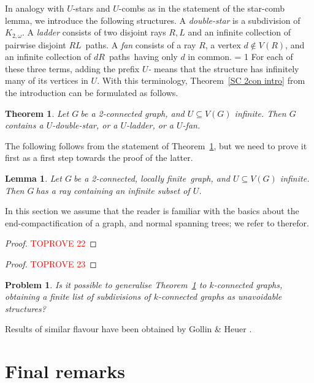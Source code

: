 \documentclass{article}
\newcommand{\Debug}{0}
\newcommand{\defi}[1]{{\color{darkgray}\emph{#1}}}
\newtheorem{theorem}[proposition]{Theorem}
\newtheorem{lemma}[proposition]{Lemma}
\newtheorem{problem}[conjecture]{{Problem}}
\newcommand{\pths}[2]{\ensuremath{#1}\text{--}\ensuremath{#2}~paths}
\newcommand{\g}{\ensuremath{G\ }}
\newcommand{\Tr}[1]{Theorem~\ref{#1}}
\newcommand{\lf}{locally finite}
\newcommand{\scl}{star-comb lemma}
\newcommand{\mymargin}[1]{\ifnum \Debug = 1
  \marginpar{\begin{minipage}{\marginparwidth}\small \begin{flushleft}{\color{blue}#1}\end{flushleft}\end{minipage}}\fi
}
\begin{document}
In analogy with $U$-stars and $U$-combs as in the statement of the \scl, we introduce the following structures. A \defi{double-star} is a subdivision of $K_{2,\omega}$. A \defi{ladder} consists of two disjoint rays $R,L$ and an infinite collection of pairwise disjoint \pths{R}{L}. A \defi{fan} consists of a ray $R$, a vertex $d\not\in V(R)$, and an infinite collection of \pths{d}{R}\ having only $d$ in common. \mymargin{(\fig{})} For each of these three terms, adding the prefix \defi{$U$-} means that the structure has infinitely many of its vertices in $U$. With this terminology, \Tr{SC 2con intro} from the introduction can be formulated as follows.


\begin{theorem} \label{SC 2con}
Let \g be a 2-connected graph, and $U\subseteq V(G)$ infinite. Then \g contains a $U$-double-star, or a $U$-ladder, or a $U$-fan. 
\end{theorem}




The following follows from the statement of \Tr{SC 2con}, but we need to prove it first as a first step towards the proof of the latter.
\begin{lemma} \label{comb 2con}
Let \g be a 2-connected, \lf\ graph, and $U\subseteq V(G)$ infinite. Then \g has a ray containing an infinite subset of $U$.
\end{lemma}

In this section we assume that the reader is familiar with the basics about the end-compac\-ti\-fication of a graph, and normal spanning trees; we refer to \cite{diestelBook05} therefor.
\begin{proof}\textcolor{red}{TOPROVE 22}\end{proof}

\begin{proof}\textcolor{red}{TOPROVE 23}\end{proof}

\begin{problem} Is it possible to generalise \Tr{SC 2con} to $k$-connected graphs, obtaining a finite list of subdivisions of $k$-connected graphs as unavoidable structures?
\end{problem} 

Results of similar flavour have been obtained by Gollin \& Heuer \cite{GolHeuCha}.

\section{Final remarks} \label{final}
\end{document}
